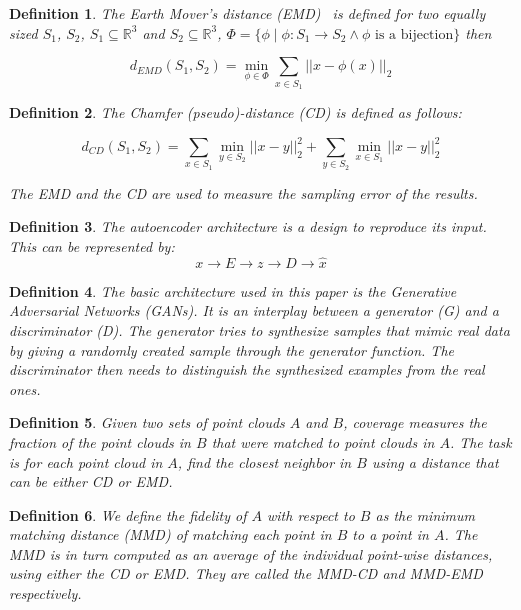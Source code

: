 \documentclass[12pt]{article}
\newtheorem{definition}{Definition}
\begin{document}
    \begin{definition}
        The \emph{Earth Mover's distance (EMD)}~\cite{Rubner2000} is defined for two equally sized $S_{1}$, $S_{2}$, $S_{1} \subseteq \mathbb{R} ^{3}$ and $S_{2} \subseteq \mathbb{R} ^{3}$, $\Phi = \{ \phi \mid \phi: S_{1} \to S_{2} \land \phi \text{ is a bijection}\}$ then

        \[d_{EMD}(S_{1}, S_{2}) = \min _{\phi \in \Phi} \sum_{x \in S_{1}} || x - \phi(x)||_{2}\]
    \end{definition}

    \begin{definition}
        The Chamfer (pseudo)-distance (CD) is defined as follows:

        \[d_{CD}(S_{1}, S_{2}) = \sum_{x \in S_{1}} \min _{y \in S_{2}} || x - y||_{2}^{2} +
        \sum_{y \in S_{2}} \min_{x \in S_{1}} ||x - y||_{2}^{2}\]

        The EMD and the CD are used to measure the sampling error of the results.
    \end{definition}

    \begin{definition}
        The \emph{autoencoder} architecture is a design to reproduce its input.
        This can be represented by:
        \[x \to E \to z \to D \to \hat{x}\]
    \end{definition}

    \begin{definition}
        The basic architecture used in this paper is the \emph{Generative Adversarial Networks} (GANs).
        It is an interplay between a \emph{generator} (G) and a \emph{discriminator} (D).
        The generator tries to synthesize samples that mimic real data by giving a randomly created sample through the generator function.
        The discriminator then needs to distinguish the synthesized examples from the real ones.
    \end{definition}

    \begin{definition}
        Given two sets of point clouds $A$ and $B$, \emph{coverage} measures the fraction of the point clouds in $B$ that were matched to point clouds in $A$.
        The task is for each point cloud in $A$, find the closest neighbor in $B$ using a distance that can be either CD or EMD.
    \end{definition}

    \begin{definition}
        We define the \emph{fidelity} of $A$ with respect to $B$ as the \emph{minimum matching distance} (MMD) of matching each point in $B$ to a point in $A$.
        The MMD is in turn computed as an average of the individual point-wise distances, using either the CD or EMD.
        They are called the MMD-CD and MMD-EMD respectively.
    \end{definition}
\end{document}
